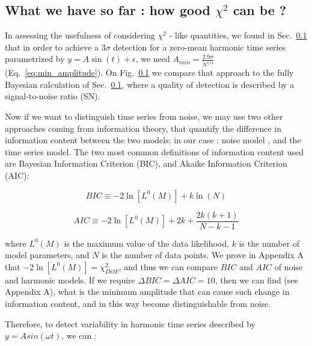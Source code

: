 \documentclass[fleqn,usenatbib]{mnras}  %
\begin{document}
\subsection{What we have so far : how good $\chi^{2}$ can be ? }

In assessing the usefulness of  considering $\chi^{2}$  - like quantities, we found in Sec.~\ref{}  that in order to achieve a $3 \sigma$ detection for a zero-mean harmonic time series  parametrized by $y = A \sin(t) + \epsilon $,  we need $A_{min} = \frac{2.9 \sigma}{N^{1/4}}$ (Eq.~\ref{eq:min_amplitude}).  On Fig.~\ref{} we compare that approach to the fully Bayesian calculation of Sec.~\ref{}, where a quality of detection is described by a signal-to-noise ratio (SN). 

Now if we want to distinguish time series from noise, we may use two other approaches coming from information theory, that quantify the difference in information content between the two models; in our case : noise model , and the time series model.  The two most common definitions of information content used are  Bayesian Information Criterion  (BIC), and Akaike Information Criterion (AIC):

\begin{equation}
\label{eq:BIC}
BIC \equiv -2 \ln [L^{0}(M)] + k \ln(N)
\end{equation}

\begin{equation}
\label{eq:AIC}
AIC \equiv -2 \ln[L^{0}(M)] + 2k + \frac{2k(k+1)}{N-k-1}
\end{equation}

where $L^{0}(M)$ is the maximum value of the data likelihood, $k$ is the number of model parameters, and $N$ is the number of data points. We prove in Appendix A that $-2 \ln[L^{0}(M)] = \chi^{2}_{DOF}$, and thus we can compare $BIC$ and $AIC$ of noise and harmonic models. If we require $\Delta BIC = \Delta AIC = 10$, then we can find (see Appendix A), what is the minimum amplitude that can cause such change in information content, and in this way become distinguishable from noise. 

Therefore, to detect variability in harmonic time series described by $y = A sin(\omega t)$, we can : 
\end{document}
